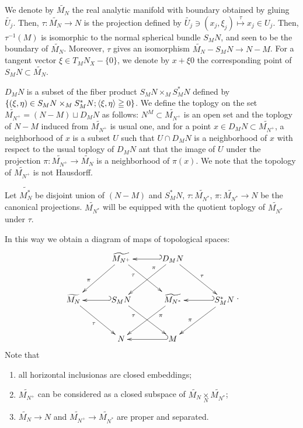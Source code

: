 We denote by $\widetilde{M_N}$ the real analytic manifold 
with boundary obtained by gluing $\widetilde{U_j}$.
Then, $\tau \colon \widetilde{M_N} \to N$ is the projection defined 
by $\widetilde{U_j}\ni (x_j,\xi_j)\overset{\tau}{\mapsto}x_j\in U_j$. 
Then, $\tau^{-1}(M)$ is isomorphic to the normal spherical 
bundle $S_{M}N$, and seen to be the boundary 
of $\widetilde{M_N}$. Moreover, $\tau$ gives 
an isomorphism $\widetilde{M_N}-S_{M}N \to N - M$. 
For a tangent vector $\xi \in T_{M}N_X - \{0\}$, 
we denote by $x+\xi0$ the corresponding point 
of $S_{M}N\subset \widetilde{M_N}$. 

$D_{M}N$ is a subset of the fiber 
product $S_{M}N\times_{M}S_{M}^{\ast}N$ defined 
by $\{(\xi,\eta)\in S_{M}N\times_{M}S_{M}^{\ast}N; 
\inner<\xi,\eta>\geqq 0\}$. 
We define the toplogy on the 
set $\widetilde{M_{N^+}} = (N-M) \sqcup D_{M}N$ as 
follows: $N^M \subset \widetilde{M_{N^+}}$ is an open set 
and the toplogy of $N-M$ induced from $\widetilde{M_{N^+}}$ is 
usual one, and for 
a point $x\in D_{M}N \subset \widetilde{M_{N^+}}$, a 
neighborhood of $x$ is a subset $U$ such 
that $U\cap D_{M}N$ is a neighborhood of $x$ with 
respect to the usual toplogy of $D_{M}N$ ant that 
the image of $U$ under the 
projection $\pi\colon \widetilde{M_{N^+}}\to 
\widetilde{M_{N}}$ is a neighborhood of $\pi(x)$. We note that 
the topology of $\widetilde{M_{N^+}}$ is not Hausdorff.

Let $\widetilde{M_N^{\ast}}$ be disjoint union 
of $(N-M)$ and $S_{M}^{\ast}N$, $\tau\colon 
\widetilde{M_{N^{\ast}}}$, $\pi\colon 
\widetilde{M_{N^{\ast}}}\to N$ be the canonical projections. 
$\widetilde{M_{N^{\ast}}}$ will be equipped 
with the quotient toplogy 
of $\widetilde{M_{N^{\ast}}}$ under $\tau$. 

In this way we obtain a diagram of maps of topological spaces:
\begin{equation}
    \vcenter{\xymatrix
    @C=32pt@R=32pt
    {
        &\widetilde{M_{N^+}}
        \ar[dl]_(.6){\pi}
        \ar[dr]_(.3){\tau}
        &
        D_{M}{N}
        \ar@{_{(}->}[l]^-{}
        \ar[dl]_(.3){\pi}
        \ar[dr]^(.5){\tau}
        &\\
        \widetilde{M_N}
        \ar[dr]_(.5){\tau}
        &S_M{N}
        \ar@{_{(}->}[l]^-{}
        \ar[dr]_(.3){\tau}
        &\widetilde{M_{N^\ast}}
        \ar[dl]^(.3){\pi}
        &S_M^\ast{N}
        \ar@{_{(}->}[l]^-{}
        \ar[dl]_(.6){\pi}
        \\
        &N
        &M
        \ar@{_{(}->}[l]^-{}
    }}.
\end{equation}
Note that
\begin{enumerate}[1)]
    \item all horizontal inclusionas are closed embeddings;
    \item \(\widetilde{M_{N^+}}\) can be considered as a closed subspace of \(\widetilde{M_N}\mathop{\times}\limits_{N}\widetilde{M_{N^\ast}}\);
    \item \(\widetilde{M_N}\to N\) and \(\widetilde{M_{N^+}}\to \widetilde{M_{N^\ast}}\) are proper and separated.
\end{enumerate}

